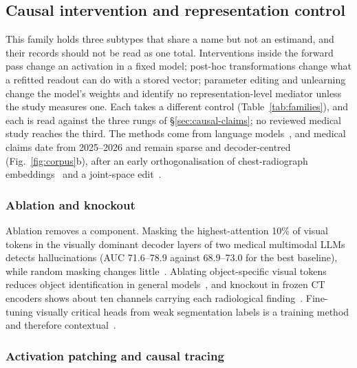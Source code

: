 \subsection{Causal intervention and representation control}
\label{sec:intervention}

This family holds three subtypes that share a name but not an estimand, and their records should not be
read as one total. Interventions inside the forward pass change an activation in a fixed model; post-hoc
transformations change what a refitted readout can do with a stored vector; parameter editing and
unlearning change the model's weights and identify no representation-level mediator unless the study
measures one. Each takes a different control (Table~\ref{tab:families}), and each is read against the
three rungs of \S\ref{sec:causal-claims}; no reviewed medical study reaches the third. The methods come from language
models~\cite{vig2020causal,geiger2021causal,geiger2023causal,meng2022locating,meng2022mass,zhang2023towards,turner2023steering,rimsky2023steering,zou2023representation,li2023inference,arditi2024refusal},
and medical claims date from 2025--2026 and remain sparse and decoder-centred
(Fig.~\ref{fig:corpus}b), after an early orthogonalisation of chest-radiograph
embeddings~\cite{weber2023posthoc} and a joint-space edit~\cite{sadashivaiah2024explaining}.

\subsubsection{Ablation and knockout}

Ablation removes a component. Masking the highest-attention 10\% of visual tokens in the visually
dominant decoder layers of two medical multimodal LLMs detects hallucinations (AUC 71.6--78.9 against
68.9--73.0 for the best baseline), while random masking changes little~\cite{chen2026vihd}. Ablating
object-specific visual tokens reduces object identification in general models~\cite{neo2024towards}, and
knockout in frozen CT encoders shows about ten channels carrying each radiological
finding~\cite{nooralahzadeh2026sparse}. Fine-tuning visually critical heads from weak segmentation
labels is a training method and therefore contextual~\cite{chang2025focus}.

\subsubsection{Activation patching and causal tracing}

